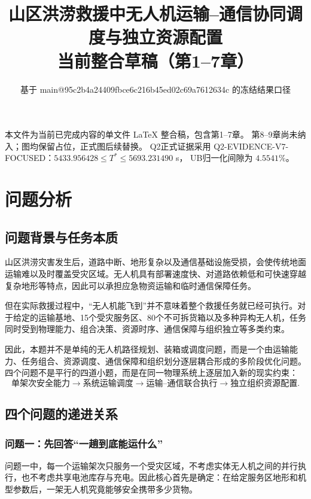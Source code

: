 \documentclass[UTF8,a4paper,12pt]{ctexart}
\title{山区洪涝救援中无人机运输--通信协同调度与独立资源配置\\
\large 当前整合草稿（第1--7章）}
\author{}
\date{基于 main@95c2b4a24409fbce6c216b45ed02c69a7612634c 的冻结结果口径}
\begin{document}
\maketitle

\begin{center}
\small
本文件为当前已完成内容的单文件 \LaTeX{} 整合稿，包含第1--7章。
第8--9章尚未纳入；图均保留占位，正式图后续替换。
Q2正式证据采用 Q2-EVIDENCE-V7-FOCUSED：$5433.956428\le T^*\le5693.231490$ s，
UB归一化间隙为 $4.5541\%$。
\end{center}

\tableofcontents
\newpage


\section{问题分析}
\label{sec:problem_analysis}

\subsection{问题背景与任务本质}

山区洪涝灾害发生后，道路中断、地形复杂以及通信基础设施受损，会使传统地面运输难以及时覆盖受灾区域。无人机具有部署速度快、对道路依赖低和可快速穿越复杂地形等特点，因此可以承担应急物资运输和临时通信保障任务。

但在实际救援过程中，“无人机能飞到”并不意味着整个救援任务就已经可执行。对于给定的运输基地、15个受灾服务区、80个不可拆货箱以及多种异构无人机，任务同时受到物理能力、组合决策、资源时序、通信保障与组织独立等多类约束。

因此，本题并不是单纯的无人机路径规划、装箱或调度问题，而是一个由运输能力、任务组合、资源调度、通信保障和组织划分逐层耦合形成的多阶段优化问题。四个问题不是平行的四道小题，而是在同一物理系统上逐层加入新的现实约束：
\[
\boxed{
\text{单架次安全能力}
\rightarrow
\text{系统运输调度}
\rightarrow
\text{运输--通信联合执行}
\rightarrow
\text{独立组织资源配置}
}.
\]

\subsection{四个问题的递进关系}

\subsubsection{问题一：先回答“一趟到底能运什么”}

问题一中，每一个运输架次只服务一个受灾区域，不考虑实体无人机之间的并行执行，也不考虑共享电池库存与充电。因此核心首先是确定：在给定服务区地形和机型参数后，一架无人机究竟能够安全携带多少货物。
\end{document}
